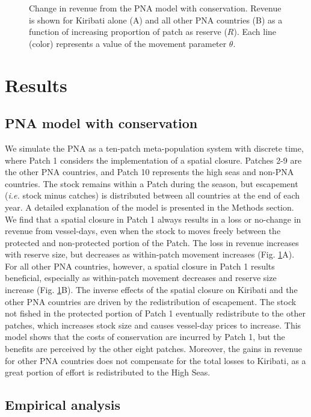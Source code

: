 \documentclass[9p,twocolumn,twoside,lineno]{pnas-new}
\begin{document}
\begin{figure}[htbp]
\caption{\label{fig:PNA_model}Change in revenue from the PNA model with conservation. Revenue is shown for Kiribati alone (A) and all other PNA countries (B) as a function of increasing proportion of patch as reserve ($R$). Each line (color) represents a value of the movement parameter $\theta$.}
\end{figure}

\section{Results}\label{results}

\subsection{PNA model with conservation}

We simulate the PNA as a ten-patch meta-population system with discrete time, where Patch 1 considers the implementation of a spatial closure. Patches 2-9 are the other PNA countries, and Patch 10 represents the high seas and non-PNA countries. The stock remains within a Patch during the season, but escapement (\emph{i.e.} stock minus catches) is distributed between all countries at the end of each year. A detailed explanation of the model is presented in the Methods section. We find that a spatial closure in Patch 1 always results in a loss or no-change in revenue from vessel-days, even when the stock to moves freely between the protected and non-protected portion of the Patch. The loss in revenue increases with reserve size, but decreases as within-patch movement increases (Fig. \ref{fig:PNA_model}A). For all other PNA countries, however, a spatial closure in Patch 1 results beneficial, especially as within-patch movement decreases and reserve size increase (Fig. \ref{fig:PNA_model}B). The inverse effects of the spatial closure on Kiribati and the other PNA countries are driven by the redistribution of escapement. The stock not fished in the protected portion of Patch 1 eventually redistribute to the other patches, which increases stock size and causes vessel-day prices to increase. This model shows that the costs of conservation are incurred by Patch 1, but the benefits are perceived by the other eight patches. Moreover, the gains in revenue for other PNA countries does not compensate for the total losses to Kiribati, as a great portion of effort is redistributed to the High Seas.

\subsection{Empirical analysis}
\end{document}

